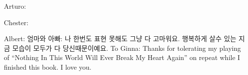 \cleardoublepage\newpage
\thispagestyle{empty}

\begin{center}

Arturo:
\vspace{0.3in}

Chester:
\vspace{0.3in}

Albert: 엄마와 아빠: 나 한번도 표현 못해도 그냥 다 고마워요. 행복하게 살수 있는 지금 모습이 모두가 다 당신때문이예요. To Ginna: Thanks for tolerating my playing of ``Nothing In This World Will Ever Break My Heart Again'' on repeat while I finished this book. I love you.
\end{center}

\setlength{\abovedisplayskip}{-5pt}
\setlength{\abovedisplayshortskip}{-5pt}
